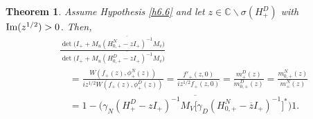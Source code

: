 \documentclass[reqno,10pt, centertags]{amsart}
\newcommand{\bbC}{{\mathbb{C}}}
\newcommand{\no}{\nonumber}
\newcommand{\lb}{\label}
\newcommand{\f}{\frac}
\newcommand{\ol}{\overline}
\newcommand{\ga}{\gamma}
\newcommand{\si}{\sigma}
\renewcommand{\Im}{\text{\rm Im}}
\numberwithin{equation}{section}
\newtheorem{theorem}{Theorem}[section]
\theoremstyle{definition}
\begin{document}
\begin{theorem} \lb{t6.9}
Assume Hypothesis \ref{h6.6} and let $z\in\bbC\backslash\si(H_+^D)$
with $\Im(z^{1/2})>0$. Then,
\begin{align}
& \frac{\det\big(I_+ +\ol{M_u(H_{0, +}^N-z I_+)^{-1} M_v}\big)}
{\det\big(I_+ +\ol{M_u(H_{0, +}^D-z I_+)^{-1}M_v}\big)}
\no \\
& \quad = \f{W(f_+(z),\phi_+^N(z))}{i z^{1/2}W(f_+(z),\phi_+^D(z))} =
\f{f'_+(z,0)}{i z^{1/2}f_+(z,0)} = \f{m_+^D(z)}{m_{0,+}^D(z)} =
\f{m_{0,+}^N(z)}{m_+^N(z)} \lb{6.82}
\\
&\quad = 1 - \big(\ol{\ga_N(H_+^D-z I_+)^{-1}M_V
\big[\ga_D(H_{0,+}^N-\ol{z}I_+)^{-1}\big]^*}\big) 1. \lb{6.83}
\end{align}
\end{theorem}
\end{document}

